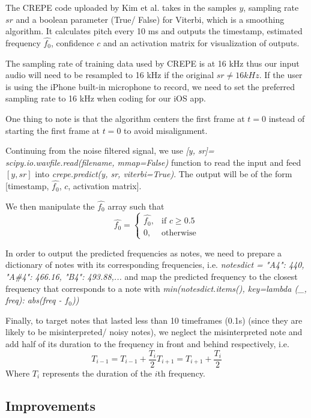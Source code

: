 The CREPE code uploaded by Kim et al. takes in the samples $y$, sampling rate $sr$ and a boolean parameter (True/ False) for Viterbi, which is a smoothing algorithm. 
It calculates pitch every 10 ms and outputs the timestamp, estimated frequency $\hat{f_0}$, confidence $c$ and an activation matrix for visualization of outputs. 

The sampling rate of training data used by CREPE is at 16 kHz thus our input audio will need to be resampled to 16 kHz if the original $sr \neq 16 kHz$. If the user is using the iPhone 
built-in microphone to record, we need to set the preferred sampling rate to 16 kHz  when coding for our iOS app.

One thing to note is that the algorithm centers the first frame at $t=0$ instead of starting the first frame at $t=0$ to avoid misalignment.

Continuing from the noise filtered signal, we use \emph{[y, sr]= scipy.io.wavfile.read(filename, mmap=False)} function to read the input and feed $[y, sr]$ 
into \emph{crepe.predict(y, sr, viterbi=True)}.
The output will be of the form [timestamp, $\hat{f_0}$, $c$, activation matrix].

We then manipulate the $\hat{f_0}$ array such that
\[\hat{f_0}= 
\begin{cases}
    \hat{f_0},      & \text{if } c\geq 0.5\\
    0,              & \text{otherwise}
\end{cases}
\label{creperesult}
\]

In order to output the predicted frequencies as notes, we need to prepare a dictionary of notes with its corresponding frequencies, i.e. 
\emph{notesdict = {"A4": 440, "A\#4": 466.16, "B4": 493.88,...}}
and map the predicted frequency to the closest frequency that corresponds to a note with \emph{min(notesdict.items(), key=lambda (\_, freq): abs(freq - $f_0$))}
 
Finally, to target notes that lasted less than 10 timeframes (0.1s) (since they are likely to be misinterpreted/ noisy notes),
we neglect the misinterpreted note and add half of its duration to the frequency in front and behind respectively, i.e.
\[T_{i-1} = T_{i-1} + \frac{T_i}{2}
T_{i+1} = T_{i+1} + \frac{T_i}{2}
    \]
Where $T_i$ represents the duration of the $i$th frequency.

\subsection{Improvements}

